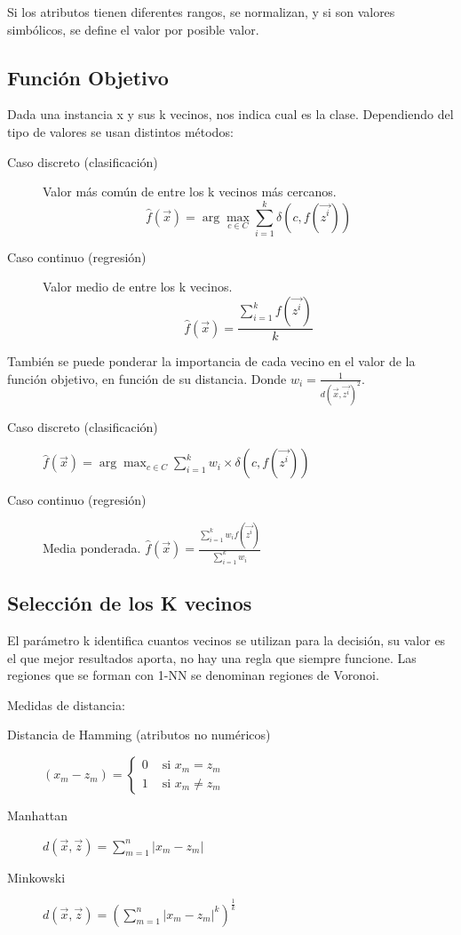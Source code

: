 \documentclass[12pt]{report} %
\begin{document}
Si los atributos tienen diferentes rangos, se normalizan, y si son valores simbólicos, se define el valor por posible valor.
\subsection{Función Objetivo}
Dada una instancia x y sus k vecinos, nos indica cual es la clase. Dependiendo del tipo de valores se usan distintos métodos:
\begin{description}
  \item[Caso discreto (clasificación)] Valor más común de entre los k vecinos más cercanos. 
  $$ \hat{f}(\vec{x}) = \arg\max _{c \in C} \sum^k_{i=1} \delta(c,f(\vec{z^i}))$$
  \item[Caso continuo (regresión)] Valor medio de entre los k vecinos. 
  $$ \hat{f}(\vec{x}) = \frac{\sum^k_{i=1} f(\vec{z^i})}{k}$$
\end{description}
También se puede ponderar la importancia de cada vecino en el valor de la función objetivo, en función de su distancia. Donde $w_i = \frac{1}{d(\vec{x},\vec{z^i})^2}$.
\begin{description}
  \item[Caso discreto (clasificación)] $ \hat{f}(\vec{x}) = \arg\max _{c \in C} \sum^k_{i=1} w_i \times \delta(c,f(\vec{z^i}))$
  \item[Caso continuo (regresión)] Media ponderada. $ \hat{f}(\vec{x}) = \frac{\sum^k_{i=1} w_i f(\vec{z^i})}{\sum^k_{i=1} w_i}$
\end{description}

\subsection{Selección de los K vecinos}
El parámetro k identifica cuantos vecinos se utilizan para la decisión, su valor es el que mejor resultados aporta, no hay una regla que siempre funcione. Las regiones que se forman con 1-NN se denominan regiones de Voronoi.

Medidas de distancia:
\begin{description}
  \item[Distancia de Hamming (atributos no numéricos)] $\left(x_{m}-z_{m}\right)=\left\{\begin{array}{ll}0 & \text { si } x_{m}=z_{m} \\ 1 & \text { si } x_{m} \neq z_{m}\end{array}\right.$
  \item[Manhattan] $d(\vec{x}, \vec{z})=\sum_{m=1}^{n}\left|x_{m}-z_{m}\right|$
  \item[Minkowski] $d(\vec{x}, \vec{z})=\left(\sum_{m=1}^{n}\left|x_{m}-z_{m}\right|^{k}\right)^{\frac{1}{k}}$
\end{description}
\end{document}
